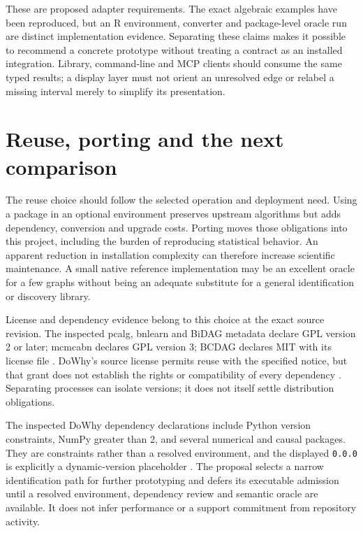 These are proposed adapter requirements. The exact algebraic examples have
been reproduced, but an R environment, converter and package-level oracle
run are distinct implementation evidence. Separating these claims makes it
possible to recommend a concrete prototype without treating a contract as
an installed integration. Library, command-line and MCP clients should
consume the same typed results; a display layer must not orient an unresolved
edge or relabel a missing interval merely to simplify its presentation.

\section{Reuse, porting and the next comparison}

The reuse choice should follow the selected operation and deployment need.
Using a package in an optional environment preserves upstream algorithms but
adds dependency, conversion and upgrade costs. Porting moves those obligations
into this project, including the burden of reproducing statistical behavior.
An apparent reduction in installation complexity can therefore increase
scientific maintenance. A small native reference implementation may be an
excellent oracle for a few graphs without being an adequate substitute for
a general identification or discovery library.

License and dependency evidence belong to this choice at the exact source
revision. The inspected pcalg, bnlearn and BiDAG metadata declare GPL version
2 or later; mcmcabn declares GPL version 3; BCDAG declares MIT with its
license file \citep{exec13_pcalg,exec13_bnlearn,exec13_bidag,
exec13_mcmcabn,exec13_bcdag}. DoWhy's source license permits reuse with
the specified notice, but that grant does not establish the rights or
compatibility of every dependency \citep{exec13_dowhy_license}.
Separating processes can isolate versions; it does not itself settle
distribution obligations.

The inspected DoWhy dependency declarations include Python version constraints,
NumPy greater than 2, and several numerical and causal packages. They are
constraints rather than a resolved environment, and the displayed
\texttt{0.0.0} is explicitly a dynamic-version placeholder
\citep{exec13_dowhy_project}. The proposal selects a narrow identification
path for further prototyping and defers its executable admission until a
resolved environment, dependency review and semantic oracle are available.
It does not infer performance or a support commitment from repository activity.

